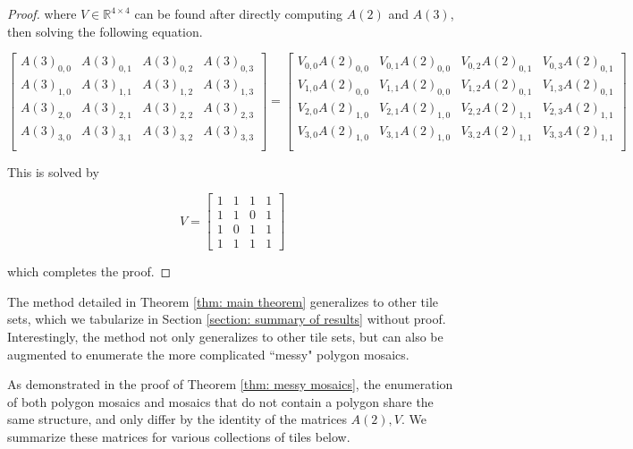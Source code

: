 \begin{proof}
where $V \in \mathbb{R}^{4 \times 4}$ can be found after directly computing $A(2)$ and $A(3)$, then solving the following equation.

$$
\begin{bmatrix}
    A(3)_{0,0} & A(3)_{0,1} & A(3)_{0,2} & A(3)_{0,3} \\
    A(3)_{1,0} & A(3)_{1,1} & A(3)_{1,2} & A(3)_{1,3} \\
    A(3)_{2,0} & A(3)_{2,1} & A(3)_{2,2} & A(3)_{2,3} \\
    A(3)_{3,0} & A(3)_{3,1} & A(3)_{3,2} & A(3)_{3,3} \\
\end{bmatrix} = 
\begin{bmatrix}
    V_{0,0}A(2)_{0,0} & V_{0,1}A(2)_{0,0} & V_{0,2}A(2)_{0,1} & V_{0,3}A(2)_{0,1} \\
    V_{1,0}A(2)_{0,0} & V_{1,1}A(2)_{0,0} & V_{1,2}A(2)_{0,1} & V_{1,3}A(2)_{0,1} \\
    V_{2,0}A(2)_{1,0} & V_{2,1}A(2)_{1,0} & V_{2,2}A(2)_{1,1} & V_{2,3}A(2)_{1,1} \\
    V_{3,0}A(2)_{1,0} & V_{3,1}A(2)_{1,0} & V_{3,2}A(2)_{1,1} & V_{3,3}A(2)_{1,1} \\
\end{bmatrix}
$$

This is solved by

$$V = 
\begin{bmatrix} 
    1 & 1 & 1 & 1 \\ 
    1 & 1 & 0 & 1 \\ 
    1 & 0 & 1 & 1 \\ 
    1 & 1 & 1 & 1 
\end{bmatrix}
$$


which completes the proof.

\end{proof}

The method detailed in Theorem \ref{thm: main theorem} generalizes to other tile sets, which we tabularize in Section \ref{section: summary of results} without proof. Interestingly, the method not only generalizes to other tile sets, but can also be augmented to enumerate the more complicated ``messy" polygon mosaics.



As demonstrated in the proof of Theorem \ref{thm: messy mosaics}, the enumeration of both polygon mosaics and mosaics that do not contain a polygon share the same structure, and only differ by the identity of the matrices $A(2), V$. We summarize these matrices for various collections of tiles below.

